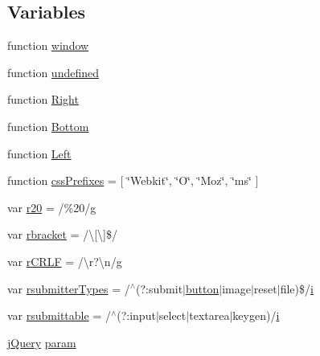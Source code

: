 \subsection*{Variables}
\begin{DoxyCompactItemize}
\item 
function \hyperlink{_scripts_2jquery-1_810_82_8js_a04a8a2bbfa9c15500892b8e5033d625b}{window}
\item 
function \hyperlink{_scripts_2jquery-1_810_82_8js_a08113a236cc18d2a9d5ce27e638012be}{undefined}
\item 
function \hyperlink{_scripts_2jquery-1_810_82_8js_ac7f66efc33d974809d85fc5bdb00c6eb}{Right}
\item 
function \hyperlink{_scripts_2jquery-1_810_82_8js_aff76c1cba4a00c678dfce0e0c5a5538a}{Bottom}
\item 
function \hyperlink{_scripts_2jquery-1_810_82_8js_abef68bf244a1159a49fe3a2c153a65d2}{Left}
\item 
function \hyperlink{_scripts_2jquery-1_810_82_8js_a2ed3892172b336458b8074254f4471da}{css\+Prefixes} = \mbox{[} \char`\"{}Webkit\char`\"{}, \char`\"{}O\char`\"{}, \char`\"{}Moz\char`\"{}, \char`\"{}ms\char`\"{} \mbox{]}
\item 
var \hyperlink{_scripts_2jquery-1_810_82_8js_a0e39f72d512af99fb5992d66f1a1c821}{r20} = /\%20/\hyperlink{_scripts_2respond_8min_8js_a103df269476e78897c9c4c6cb8f4eb06}{g}
\item 
var \hyperlink{_scripts_2jquery-1_810_82_8js_a07117e28ee58d2d2664cfbaf741e10c1}{rbracket} = /\textbackslash{}\mbox{[}\textbackslash{}\mbox{]}\$/
\item 
var \hyperlink{_scripts_2jquery-1_810_82_8js_a4fd9dfc4eb645b441a3e84730c50154b}{r\+C\+R\+L\+F} = /\textbackslash{}r?\textbackslash{}n/\hyperlink{_scripts_2respond_8min_8js_a103df269476e78897c9c4c6cb8f4eb06}{g}
\item 
var \hyperlink{_scripts_2jquery-1_810_82_8js_a0e9cd4ca08945afe827846f34a36c74a}{rsubmitter\+Types} = /$^\wedge$(?\+:submit$\vert$\hyperlink{_scripts_2bootstrap_8min_8js_a55e170814e74f6c3db8ae9ea3ba9054f}{button}$\vert$image$\vert$reset$\vert$file)\$/\hyperlink{_scripts_2respond_8min_8js_a5e25b1d1bed9ab5f3174b76d6a722180}{i}
\item 
var \hyperlink{_scripts_2jquery-1_810_82_8js_a12d248d7e6c5985c5ea21f56fbef9e90}{rsubmittable} = /$^\wedge$(?\+:input$\vert$select$\vert$textarea$\vert$keygen)/\hyperlink{_scripts_2respond_8min_8js_a5e25b1d1bed9ab5f3174b76d6a722180}{i}
\item 
\hyperlink{_scripts_2jquery-1_810_82_8js_a41c2e1bff4a6b292938143764e31d789}{j\+Query} \hyperlink{_scripts_2jquery-1_810_82_8js_a24ced9cd3c9e1970a8cbe8d7adedc765}{param}

\end{DoxyCompactItemize}
